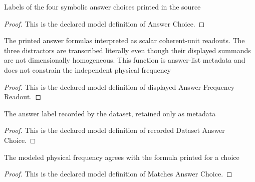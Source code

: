 \begin{definition}
  \label{def:physics:phyx-mini-0233:phyxminiproblems-problemphyxmini0233-answerchoice}
  Labels of the four symbolic answer choices printed in the source
\end{definition}
\begin{proof}
  This is the declared model definition of Answer Choice.
\end{proof}
\begin{definition}
  \label{def:physics:phyx-mini-0233:phyxminiproblems-problemphyxmini0233-displayedanswerfrequencyreadout}
  The printed answer formulas interpreted as scalar coherent-unit readouts. The three distractors are transcribed literally even though their displayed summands are not dimensionally homogeneous. This function is answer-list metadata and does not constrain the independent physical frequency
\end{definition}
\begin{proof}
  This is the declared model definition of displayed Answer Frequency Readout.
\end{proof}
\begin{definition}
  \label{def:physics:phyx-mini-0233:phyxminiproblems-problemphyxmini0233-recordeddatasetanswerchoice}
  The answer label recorded by the dataset, retained only as metadata
\end{definition}
\begin{proof}
  This is the declared model definition of recorded Dataset Answer Choice.
\end{proof}
\begin{definition}
  \label{def:physics:phyx-mini-0233:phyxminiproblems-problemphyxmini0233-matchesanswerchoice}
  The modeled physical frequency agrees with the formula printed for a choice
\end{definition}
\begin{proof}
  This is the declared model definition of Matches Answer Choice.
\end{proof}
